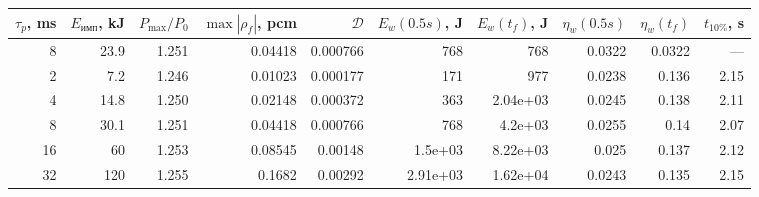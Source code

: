 \begin{tabular}{rrrrrrrrrr}
\hline
$\tau_p$, ms & $E_{\text{имп}}$, kJ & $P_{\max}/P_0$ & $\max|\rho_f|$, pcm & $\mathcal D$ & $E_w(0.5s)$, J & $E_w(t_f)$, J & $\eta_w(0.5s)$ & $\eta_w(t_f)$ & $t_{10\%}$, s\\
\hline
8 & 23.9 & 1.251 & 0.04418 & 0.000766 & 768 & 768 & 0.0322 & 0.0322 & ---\\ 
2 & 7.2 & 1.246 & 0.01023 & 0.000177 & 171 & 977 & 0.0238 & 0.136 & 2.15\\ 
4 & 14.8 & 1.250 & 0.02148 & 0.000372 & 363 & 2.04e+03 & 0.0245 & 0.138 & 2.11\\ 
8 & 30.1 & 1.251 & 0.04418 & 0.000766 & 768 & 4.2e+03 & 0.0255 & 0.14 & 2.07\\ 
16 & 60 & 1.253 & 0.08545 & 0.00148 & 1.5e+03 & 8.22e+03 & 0.025 & 0.137 & 2.12\\ 
32 & 120 & 1.255 & 0.1682 & 0.00292 & 2.91e+03 & 1.62e+04 & 0.0243 & 0.135 & 2.15\\ 
\hline
\end{tabular}
